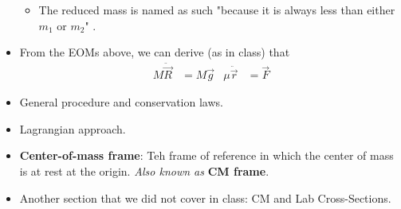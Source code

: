 \documentclass[../notes.tex]{subfiles}
\begin{document}
\begin{itemize}
\begin{equation*}
    \end{equation*}
    \begin{itemize}
        \item The reduced mass is named as such "because it is always less than either $m_1$ or $m_2$" \parencite[160]{bib:KibbleBerkshire}.
    \end{itemize}
    \item From the EOMs above, we can derive (as in class) that
    \begin{align*}
        M\ddot{\vec{R}} &= M\vec{g}&
        \mu\ddot{\vec{r}} &= \vec{F}
    \end{align*}
    \item General procedure and conservation laws.
    \item Lagrangian approach.
    \item \textbf{Center-of-mass frame}: Teh frame of reference in which the center of mass is at rest at the origin. \emph{Also known as} \textbf{CM frame}.
    \item Another section that we did not cover in class: CM and Lab Cross-Sections.
\end{itemize}
\end{document}
